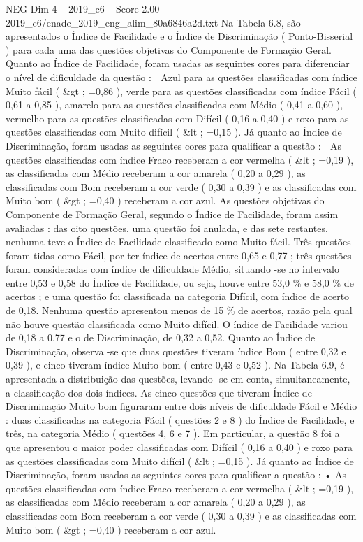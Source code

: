 \begin{textsample}{NEG Dim 4 – 2019\_c6 – Score 2.00 – 2019\_c6/enade\_2019\_eng\_alim\_80a6846a2d.txt}
Na Tabela 6.8, são apresentados o Índice de Facilidade e o Índice de Discriminação ( Ponto-Bisserial ) para cada uma das questões objetivas do Componente de Formação Geral.
Quanto ao Índice de Facilidade, foram usadas as seguintes cores para diferenciar o nível de dificuldade da questão :  Azul para as questões classificadas com índice Muito fácil ( \&gt ; =0,86 ), verde para as questões classificadas com índice Fácil ( 0,61 a 0,85 ), amarelo para as questões classificadas com Médio ( 0,41 a 0,60 ), vermelho para as questões classificadas com Difícil ( 0,16 a 0,40 ) e roxo para as questões classificadas com Muito difícil ( \&lt ; =0,15 ).
Já quanto ao Índice de Discriminação, foram usadas as seguintes cores para qualificar a questão :  As questões classificadas com índice Fraco receberam a cor vermelha ( \&lt ; =0,19 ), as classificadas com Médio receberam a cor amarela ( 0,20 a 0,29 ), as classificadas com Bom receberam a cor verde ( 0,30 a 0,39 ) e as classificadas com Muito bom ( \&gt ; =0,40 ) receberam a cor azul.
As questões objetivas do Componente de Formação Geral, segundo o Índice de Facilidade, foram assim avaliadas : das oito questões, uma questão foi anulada, e das sete restantes, nenhuma teve o Índice de Facilidade classificado como Muito fácil.
Três questões foram tidas como Fácil, por ter índice de acertos entre 0,65 e 0,77 ; três questões foram consideradas com índice de dificuldade Médio, situando -se no intervalo entre 0,53 e 0,58 do Índice de Facilidade, ou seja, houve entre 53,0 \% e 58,0 \% de acertos ; e uma questão foi classificada na categoria Difícil, com índice de acerto de 0,18.
Nenhuma questão apresentou menos de 15 \% de acertos, razão pela qual não houve questão classificada como Muito difícil.
O índice de Facilidade variou de 0,18 a 0,77 e o de Discriminação, de 0,32 a 0,52.
Quanto ao Índice de Discriminação, observa -se que duas questões tiveram índice Bom ( entre 0,32 e 0,39 ), e cinco tiveram índice Muito bom ( entre 0,43 e 0,52 ).
Na Tabela 6.9, é apresentada a distribuição das questões, levando -se em conta, simultaneamente, a classificação dos dois índices.
As cinco questões que tiveram Índice de Discriminação Muito bom figuraram entre dois níveis de dificuldade Fácil e Médio : duas classificadas na categoria Fácil ( questões 2 e 8 ) do Índice de Facilidade, e três, na categoria Médio ( questões 4, 6 e 7 ).
Em particular, a questão 8 foi a que apresentou o maior poder classificadas com Difícil ( 0,16 a 0,40 ) e roxo para as questões classificadas com Muito difícil ( \&lt ; =0,15 ).
Já quanto ao Índice de Discriminação, foram usadas as seguintes cores para qualificar a questão : • As questões classificadas com índice Fraco receberam a cor vermelha ( \&lt ; =0,19 ), as classificadas com Médio receberam a cor amarela ( 0,20 a 0,29 ), as classificadas com Bom receberam a cor verde ( 0,30 a 0,39 ) e as classificadas com Muito bom ( \&gt ; =0,40 ) receberam a cor azul.

\end{textsample}
